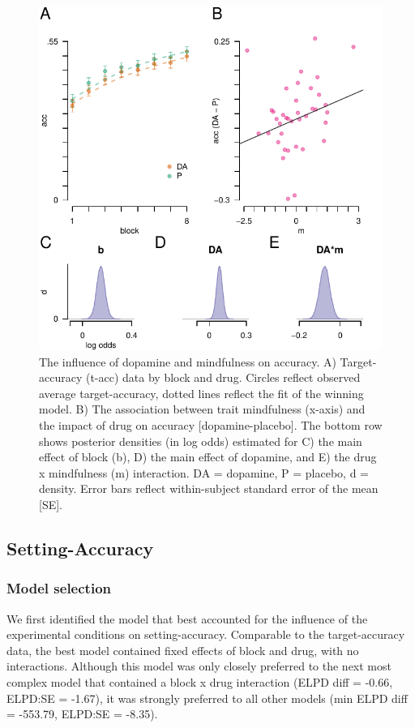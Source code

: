 \documentclass[
  man]{apa6}
\begin{document}
\begin{figure}

{\centering \includegraphics[width=0.7\linewidth]{../../images/acc_fig} 

}

\caption{The influence of dopamine and mindfulness on accuracy. A) Target-accuracy (t-acc) data by block and drug. Circles reflect observed average target-accuracy, dotted lines reflect the fit of the winning model. B) The association between trait mindfulness (x-axis) and the impact of drug on accuracy [dopamine-placebo]. The bottom row shows posterior densities (in log odds) estimated for C) the main effect of block (b), D) the main effect of dopamine, and E) the drug x mindfulness (m) interaction. DA = dopamine, P = placebo, d = density. Error bars reflect within-subject standard error of the mean [SE].}\label{fig:accfig}
\end{figure}

\hypertarget{setting-accuracy-1}{%
\subsection{Setting-Accuracy}\label{setting-accuracy-1}}

\label{sec:Setting-Accuracy Results}

\hypertarget{model-selection-1}{%
\subsubsection{Model selection}\label{model-selection-1}}

We first identified the model that best accounted for the influence of the experimental conditions on setting-accuracy. Comparable to the target-accuracy data, the best model contained fixed effects of block and drug, with no interactions. Although this model was only closely preferred to the next most complex model that contained a block x drug interaction (ELPD diff = -0.66, ELPD:SE = -1.67), it was strongly preferred to all other models (min ELPD diff = -553.79, ELPD:SE = -8.35).
\end{document}
